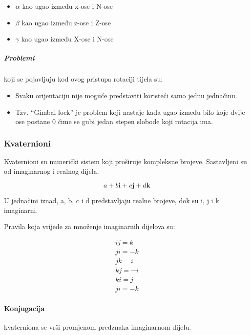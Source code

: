 \documentclass[../Document.tex]{subfiles}
\begin{document}
\begin{itemize}
    \item $\alpha$ kao ugao između x-ose i N-ose
    \item $\beta$ kao ugao između z-ose i Z-ose
    \item $\gamma$ kao ugao između X-ose i N-ose
\end{itemize}


\subparagraph{Problemi} koji se pojavljuju kod ovog pristupa rotaciji tijela su:

\begin{itemize}
    \item Svaku orijentaciju nije moguće predstaviti koristeći samo jednu jednačinu.
    \item Tzv. ``Gimbal lock'' je problem koji nastaje kada ugao između bilo koje dvije ose postane 0{\textdegree}  čime se gubi jedan stepen slobode koji rotacija ima.
\end{itemize}

\subsubsection{Kvaternioni}
Kvaternioni su numerički sistem koji proširuje kompleksne brojeve. Sastavljeni su od imaginarnog i realnog dijela.

$$
    a+b\mathbf{i}+c\mathbf{j}+d\mathbf{k}
$$

\noindent U jednačini iznad, a, b, c i d predstavljaju realne brojeve, dok su i, j i k imaginarni.

\noindent Pravila koja vrijede za množenje imaginarnih dijelova su:

\begin{align*}
    ij=k  \\
    ji=-k \\
    jk=i  \\
    kj=-i \\
    ki=j  \\
    ji=-k
\end{align*}


\paragraph{Konjugacija}
kvaterniona se vrši promjenom predznaka imaginarnom dijelu.
\end{document}
